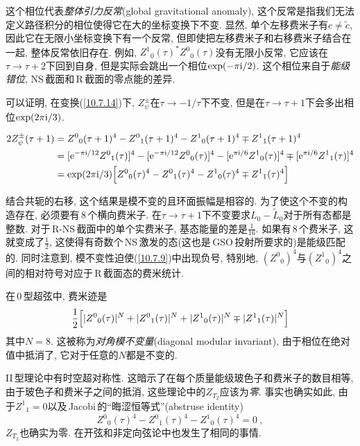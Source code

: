 这个相位代表{\emph{整体引力反常}}(global gravitational anomaly), 这个反常是指我们无法定义路径积分的相位使得它在大的坐标变换下不变. 显然, 单个左移费米子有$ c\neq\tilde{c}$, 因此它在无限小坐标变换下有一个反常, 但即使把左移费米子和右移费米子结合在一起, 整体反常依旧存在. 例如, $Z^{1}{}_{0}(\tau)^{\ast}Z^{0}{}_{0}(\tau) $没有无限小反常, 它应该在$ \tau\to\tau+2 $下回到自身, 但是实际会跳出一个相位$\exp(-\pi\mathrm{i}/2)$. 这个相位来自于{\emph{能级错位}}, NS\,截面和\,R\,截面的零点能的差异.

可以证明, 在变换(\ref{10.7.14})下, $Z_{\psi}^{\pm} $在$ \tau\to-1/\tau $下不变, 但是在$ \tau\to\tau+1 $下会多出相位$ \exp(2\pi\mathrm{i}/3)$.
\begin{tcolorbox}
\begin{align*}
     2Z_{\psi}^{\pm}(\tau+1) &=Z^{0}{}_{0}(\tau+1)^{4}-Z^{0}{}_{1}(\tau+1)^{4}-Z^{1}{}_{0}(\tau+1)^{4}\mp Z^{1}{}_{1}(\tau+1)^{4} \\
     &= [\mathrm{e}^{-\pi\mathrm{i}/12}Z^{0}{}_{1}(\tau)]^{4}-[\mathrm{e}^{-\pi\mathrm{i}/12}Z^{0}{}_{0}(\tau)]^{4}
     -[\mathrm{e}^{\pi\mathrm{i}/6}Z^{1}{}_{0}(\tau)]^{4}\mp[\mathrm{e}^{\pi\mathrm{i}/6}Z^{1}{}_{1}(\tau)]^{4} \\
     &=\exp(2\pi\mathrm{i}/3)\Bigl[Z^{0}{}_{0}(\tau)^{4}-Z^{0}{}_{1}(\tau)^{4}-Z^{1}{}_{0}(\tau)^{4}\mp Z^{1}{}_{1}(\tau)^{4}\Bigr]
\end{align*}
\end{tcolorbox}
\noindent 结合共轭的右移, 这个结果是模不变的且环面振幅是相容的. 为了使这个不变的构造存在, 必须要有\,8\,个横向费米子. 在$ \tau\to\tau+1 $下不变要求$ L_{0}-\tilde{L}_{0} $对于所有态都是整数. 对于\,R-NS\,截面中的单个实费米子, 基态能量的差是$ \frac{1}{16}$. 如果有\,8\,个费米子, 这就变成了$ \frac{1}{2}$, 这使得有奇数个\,NS\,激发的态(这也是\,GSO\,投射所要求的)是能级匹配的. 同时注意到, 模不变性迫使(\ref{10.7.9})中出现负号, 特别地, $(Z^{0}{}_{0})^{4} $与$ (Z^{1}{}_{0})^{4} $之间的相对符号对应于\,R\,截面态的费米统计.


在\,0\,型超弦中, 费米迹是
\begin{equation}
    \frac{1}{2} \Bigl[\lvert Z^{0}{}_{0}(\tau)\rvert^{N}+\lvert Z^{0}{}_{1}(\tau)\rvert^{N}+\lvert Z^{1}{}_{0}(\tau)\rvert^{N}\mp \lvert Z^{1}{}_{1}(\tau)\rvert^{N} \Bigr] \label{10.7.15}
\end{equation}
其中$ N=8$. 这被称为{\emph{对角模不变量}}(diagonal modular invariant), 由于相位在绝对值中抵消了, 它对于任意的$ N $都是不变的.

II\,型理论中有时空超对称性. 这暗示了在每个质量能级玻色子和费米子的数目相等, 由于玻色子和费米子之间的抵消, 这些理论中的$ Z_{T_{2}} $应该为{\emph{零}}. 事实也确实如此, 由于$ Z^{1}{}_{1}=0 $以及\,Jacobi\,的``晦涩恒等式''(abstruse identity)
\begin{equation}
    Z^{0}{}_{0}(\tau)^{4}-Z^{0}{}_{1}(\tau)^{4}-Z^{1}{}_{0}(\tau)^{4}=0 \:,\label{10.7.16}
\end{equation}
$Z_{T_{2}} $也确实为零. 在开弦和非定向弦论中也发生了相同的事情.


